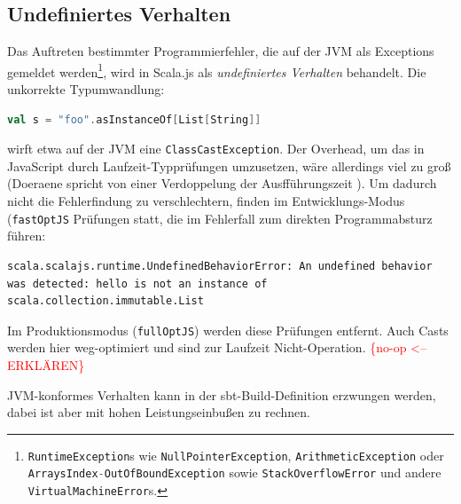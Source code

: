 \documentclass[a4paper, 12pt, hidelinks, listof=totoc, listoftables=totoc, bibliography=totoc]{scrreprt}
\newcommand{\code}[1]{\lstinline[language=Scala, style=inline]|#1|}
\newcommand{\scala}[1]{\lstinline[language=Scala, style=inline]|#1|}
\newcommand{\TODOi}[1]{\textcolor{red}{\{#1\}}}
\begin{document}
\subsection{Undefiniertes Verhalten}\label{subsec:undefined-behavior}

Das Auftreten bestimmter Programmierfehler, die auf der JVM als Exceptions gemeldet werden\footnote{\scala{RuntimeException}s wie \scala{NullPointerException}, \scala{ArithmeticException} oder \scala{ArraysIndex-OutOfBoundException} sowie \scala{StackOverflowError} und andere \scala{VirtualMachineError}s.},
wird in Scala.js als \emph{undefiniertes Verhalten} behandelt. Die unkorrekte Typumwandlung:

\begin{lstlisting}[language=Scala, style=snippet]
val s = "foo".asInstanceOf[List[String]]
\end{lstlisting}

wirft etwa auf der JVM eine \scala{ClassCastException}. Der Overhead, um das in JavaScript durch Laufzeit-Typprüfungen umzusetzen, wäre allerdings viel zu groß (Doeraene spricht von einer Verdoppelung der Ausfführungszeit \cite[Folie 23 ff., Min. 15]{doeraene2015.SSP}). Um dadurch nicht die Fehlerfindung zu verschlechtern, finden im Entwicklungs-Modus (\code{fastOptJS} Prüfungen statt, die im Fehlerfall zum direkten Programmabsturz führen:

\begin{lstlisting}[style=snippet]
scala.scalajs.runtime.UndefinedBehaviorError: An undefined behavior was detected: hello is not an instance of scala.collection.immutable.List
\end{lstlisting}

Im Produktionsmodus (\code{fullOptJS}) werden diese Prüfungen entfernt. Auch Casts werden hier weg-optimiert und sind zur Laufzeit Nicht-Operation. \TODOi{no-op <-- ERKLÄREN}

JVM-konformes Verhalten kann in der sbt-Build-Definition erzwungen werden, dabei ist aber mit hohen Leistungseinbußen zu rechnen.\cite[Folie 23 ff., Min. 15]{doeraene2015.SSP}\cite{scalajs.DSS}
\end{document}
